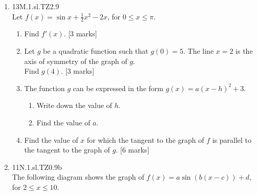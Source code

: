 \documentclass[12pt, twoside]{article}
\begin{document}
\begin{enumerate}
    \item 13M.1.sl.TZ2.9\\
    Let $f(x)=\sin x + \frac{1}{2} x^2 -2x$, for $0 \leq x \leq \pi$.\\
    \begin{enumerate}
      \item Find $f'(x)$. [3 marks]
      \item Let $g$ be a quadratic function such that $g(0)=5$. The line $x=2$ is the axis of symmetry of the graph of $g$.\\
      Find $g(4)$. [3 marks]
      \item The function $g$ can be expressed in the form $g(x)=a(x-h)^2+3$.
        \begin{enumerate}
          \item Write down the value of $h$.
          \item Find the value of $a$.
        \end{enumerate}
      \item Find the value of $x$ for which the tangent to the graph of $f$ is parallel to the tangent to the graph of $g$. [6 marks]
    \end{enumerate}

    \item 11N.1.sl.TZ0.9b\\
    The following diagram shows the graph of $f(x)=a \sin (b(x-c))+d$, for $2 \leq x \leq 10$.
      \begin{center}
\end{center}
\end{enumerate}
\end{document}
